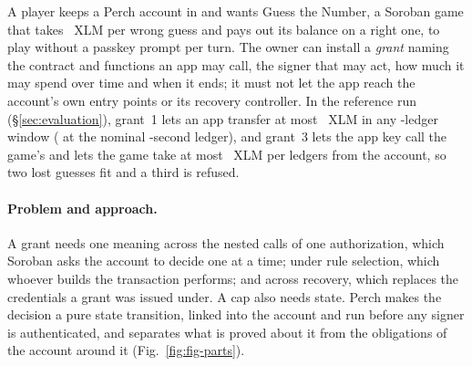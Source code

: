 A player keeps a Perch account in  and wants Guess the Number,
a Soroban game that takes ~XLM per wrong guess and
pays out its balance on a right one, to play without a passkey prompt per turn.
The owner can install a \emph{grant} naming the contract and functions an app may
call, the signer that may act, how much it may spend over time and when it ends;
it must not let the app reach the account's own entry points or its recovery
controller. In the reference run (\S\ref{sec:evaluation}), grant~1 lets an app
transfer at most ~XLM in any
-ledger window ( at the
nominal -second ledger), and grant~3 lets the app key
call the game's  and lets the game take at most
~XLM per  ledgers from the
account, so two lost guesses fit and a third is refused.

\paragraph{Problem and approach.} A grant needs one meaning across the nested
calls of one authorization, which Soroban asks the account to decide one at a
time; under rule selection, which whoever builds the transaction performs; and
across recovery, which replaces the credentials a grant was issued under. A cap
also needs state. Perch makes the decision a pure state transition, linked into
the account and run before any signer is authenticated, and separates what is
proved about it from the obligations of the account around it
(Fig.~\ref{fig:fig-parts}).


